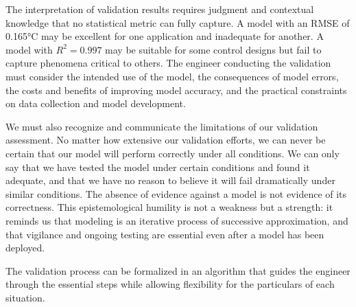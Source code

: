 The interpretation of validation results requires judgment and contextual knowledge that no statistical metric can fully capture. A model with an RMSE of 0.165°C may be excellent for one application and inadequate for another. A model with $R^2 = 0.997$ may be suitable for some control designs but fail to capture phenomena critical to others. The engineer conducting the validation must consider the intended use of the model, the consequences of model errors, the costs and benefits of improving model accuracy, and the practical constraints on data collection and model development.

We must also recognize and communicate the limitations of our validation assessment. No matter how extensive our validation efforts, we can never be certain that our model will perform correctly under all conditions. We can only say that we have tested the model under certain conditions and found it adequate, and that we have no reason to believe it will fail dramatically under similar conditions. The absence of evidence against a model is not evidence of its correctness. This epistemological humility is not a weakness but a strength: it reminds us that modeling is an iterative process of successive approximation, and that vigilance and ongoing testing are essential even after a model has been deployed.

The validation process can be formalized in an algorithm that guides the engineer through the essential steps while allowing flexibility for the particulars of each situation.

